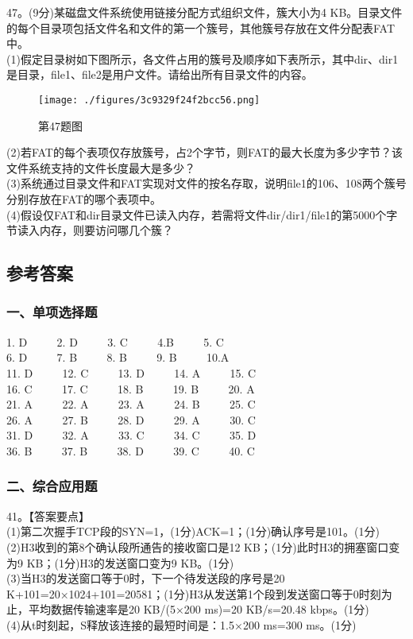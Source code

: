 47。(9分)某磁盘文件系统使用链接分配方式组织文件，簇大小为4 KB。目录文件的每个目录项包括文件名和文件的第一个簇号，其他簇号存放在文件分配表FAT中。 \\
(1)假定目录树如下图所示，各文件占用的簇号及顺序如下表所示，其中dir、dir1是目录，file1、file2是用户文件。请给出所有目录文件的内容。 \\
\begin{figure}[ht]
\centering
\texttt{[image: ./figures/3c9329f24f2bcc56.png]}
\caption{第47题图} \label{fig_CSN16_6}
\end{figure}
(2)若FAT的每个表项仅存放簇号，占2个字节，则FAT的最大长度为多少字节？该文件系统支持的文件长度最大是多少？ \\
(3)系统通过目录文件和FAT实现对文件的按名存取，说明file1的106、108两个簇号分别存放在FAT的哪个表项中。 \\
(4)假设仅FAT和dir目录文件已读入内存，若需将文件dir/dir1/file1的第5000个字节读入内存，则要访问哪几个簇？

\subsection{参考答案}
\subsubsection{一、单项选择题}
1. D  $\qquad$ 2. D $\qquad$ 3. C $\qquad$ 4.B $\qquad$ 5. C \\
6. D $\qquad$ 7. B $\qquad$ 8. B $\qquad$ 9. B $\qquad$ 10.A \\
11. D $\qquad$ 12. C $\qquad$ 13. D $\qquad$ 14. A $\qquad$ 15. C \\
16. C $\qquad$ 17. C $\qquad$ 18. B $\qquad$ 19. B $\qquad$ 20. A \\
21. A $\qquad$ 22. A $\qquad$ 23. A $\qquad$ 24. B $\qquad$ 25. C \\
26. A $\qquad$ 27. B $\qquad$ 28. D $\qquad$ 29. A $\qquad$ 30. C \\
31. D $\qquad$ 32. A $\qquad$ 33. C $\qquad$ 34. C $\qquad$ 35. D \\
36. B $\qquad$ 37. B $\qquad$ 38. D $\qquad$ 39. C $\qquad$ 40. C

\subsubsection{二、综合应用题}
41。【答案要点】 \\
(1)第二次握手TCP段的SYN=1，(1分)ACK=1；(1分)确认序号是101。(1分) \\
(2)H3收到的第8个确认段所通告的接收窗口是12 KB；(1分)此时H3的拥塞窗口变为9 KB；(1分)H3的发送窗口变为9 KB。(1分) \\
(3)当H3的发送窗口等于0时，下一个待发送段的序号是20 K+101=20×1024+101=20581；(1分)H3从发送第1个段到发送窗口等于0时刻为止，平均数据传输速率是20 KB/(5×200 ms)=20 KB/s=20.48 kbps。(1分) \\
(4)从t时刻起，S释放该连接的最短时间是：1.5×200 ms=300 ms。(1分)

